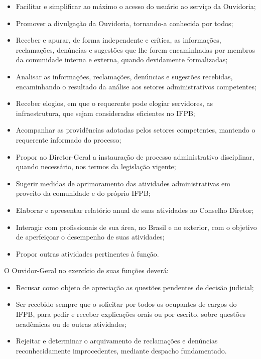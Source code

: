 \begin{itemize}
\item Facilitar e simplificar ao máximo o acesso do usuário ao serviço da Ouvidoria;

\item Promover a divulgação da Ouvidoria, tornando-a conhecida por todos;

\item Receber e apurar, de forma independente e crítica, as informações, reclamações, denúncias e sugestões que lhe forem encaminhadas por membros da comunidade interna e externa, quando devidamente formalizadas;

\item Analisar as informações, reclamações, denúncias e sugestões recebidas, encaminhando o resultado da análise aos setores administrativos competentes;

\item Receber elogios, em que o requerente pode elogiar servidores, as infraestrutura, que sejam consideradas eficientes no IFPB;

\item Acompanhar as providências adotadas pelos setores competentes, mantendo o requerente informado do processo;

\item Propor ao Diretor-Geral a instauração de processo administrativo disciplinar, quando necessário, nos termos da legislação vigente;

\item Sugerir medidas de aprimoramento das atividades administrativas em proveito da comunidade e do próprio IFPB;

\item Elaborar e apresentar relatório anual de suas atividades ao Conselho Diretor;

\item Interagir com profissionais de sua área, no Brasil e no exterior, com o objetivo de aperfeiçoar o desempenho de suas atividades;

\item Propor outras atividades pertinentes à função.

\end{itemize}

      O Ouvidor-Geral no exercício de suas funções deverá:

\begin{itemize}
\item Recusar como objeto de apreciação as questões pendentes de decisão judicial;

\item Ser recebido sempre que o solicitar por todos os ocupantes de cargos do IFPB, para pedir e receber explicações orais ou por escrito, sobre questões acadêmicas ou de outras atividades;

\item Rejeitar e determinar o arquivamento de reclamações e denúncias reconhecidamente improcedentes, mediante despacho fundamentado.
\end{itemize}


